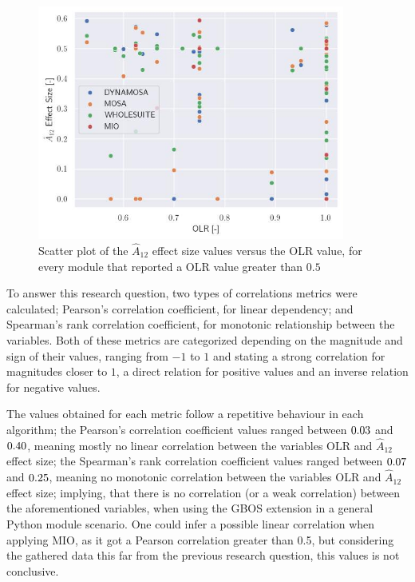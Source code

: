 \documentclass[%
  chapterprefix=false,%
  open=right,%
  twoside=true,%
  paper=a4,%
  logofile={Figures/logo.png},%
  thesistype=master,%
  UKenglish,%
]{se2thesis}
\begin{document}
\begin{figure}[bth]
  \centering
  \includegraphics[width=0.9\textwidth]{Figures/Results/scatterplot.jpg}
  \caption{Scatter plot of the \(\hat{A}_{12}\) effect size values versus the OLR value, for every module that reported a OLR value greater than \(0.5\)}\label{fig:scatter}
\end{figure}

To answer this research question, two types of correlations metrics were calculated; Pearson's correlation coefficient, for linear dependency; and Spearman's rank correlation coefficient, for monotonic relationship between the variables.
Both of these metrics are categorized depending on the magnitude and sign of their values, ranging from \(-1\) to \(1\) and stating a strong correlation for magnitudes closer to \(1\), a direct relation for positive values and an inverse relation for negative values.

The values obtained for each metric follow a repetitive behaviour in each algorithm; the Pearson's correlation coefficient values ranged between \(0.03\) and \(0.40\), meaning mostly no linear correlation between the variables OLR and \(\hat{A}_{12}\) effect size; the Spearman's rank correlation coefficient values ranged between \(0.07\) and \(0.25\), meaning no monotonic correlation between the variables OLR and \(\hat{A}_{12}\) effect size; implying, that there is no correlation (or a weak correlation) between the aforementioned variables, when using the GBOS extension in a general Python module scenario.
One could infer a possible linear correlation when applying MIO, as it got a Pearson correlation greater than 0.5, but considering the gathered data this far from the previous research question, this values is not conclusive.
\end{document}

